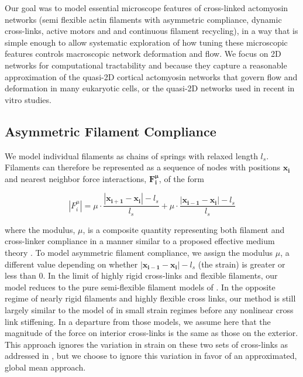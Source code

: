 \documentclass[10pt,letterpaper]{article}
\begin{document}
Our goal was to model essential microscope features of cross-linked actomyosin networks (semi flexible actin filaments with asymmetric compliance, dynamic cross-links, active motors and and continuous filament recycling), in a way that is simple enough to allow systematic exploration of how tuning these microscopic features controls macroscopic network deformation and flow. We focus on 2D networks for computational tractability and because they capture a reasonable approximation of the quasi-2D cortical actomyosin networks that govern flow and deformation in many eukaryotic cells\cite{cellmech_flows}, or the quasi-2D networks used in recent in vitro studies\cite{rheo_2D1,rheo_2D2}.


\subsection*{Asymmetric Filament Compliance}
We model individual filaments as chains of springs with relaxed length $l_s$.  Filaments can therefore be represented as a sequence of nodes with positions $\mathbf{x_i}$ and nearest neighbor force interactions, $\mathbf{F^{\mu}_i}$, of the form

\begin{equation}
\label{eqn:spring}
|F^{\mu}_i| = \mu\cdot\frac{|\mathbf{x_{i+1}}-\mathbf{x_i}|-l_s}{l_s} +\mu\cdot\frac{|\mathbf{x_{i-1}}-\mathbf{x_i}|-l_s}{l_s}
\end{equation}





where the modulus, $\mu$, is a composite quantity representing both filament and cross-linker compliance in a manner similar to a proposed effective medium theory \cite{theo_crosslinknonlinear}.   To model asymmetric filament compliance, we assign the modulus $\mu$, a different value depending on whether $|\mathbf{x_{i-1}}-\mathbf{x_i}|-l_s$ (the strain) is greater or less than 0. In the limit of highly rigid cross-links and flexible filaments, our model reduces to the pure semi-flexible filament models of \cite{theo_hlm,theo_hlm2}.  In the opposite regime of nearly rigid filaments and highly flexible cross links, our method is still largely similar to the model of \cite{theo_crosslinknonlinear} in small strain regimes before any nonlinear cross link stiffening.  In a departure from those models, we assume here that the magnitude of the force on interior cross-links is the same as those on the exterior.  This approach ignores the variation in strain on these two sets of cross-links as addressed in \cite{theo_crosslinknonlinear}, but we choose to ignore this variation in favor of an approximated, global mean approach.  
\end{document}
